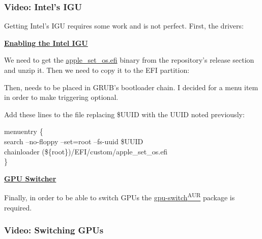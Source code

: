 \subsubsection{Video: Intel's IGU}

Getting Intel's IGU requires some work and is not perfect. First, the drivers:


\vspace*{1em}
\textbf{\textcolor{textgrey}{\uline{Enabling the Intel IGU}}}

We need to get the  \href{https://github.com/0xbb/apple\_set_os.efi}{apple\_set\_os.efi} binary from the repository's release section and unzip it. Then we need to copy it to the EFI partition:


Then,  needs to be placed in GRUB's bootloader chain. I decided for a menu item in order to make triggering  optional.

\begin{blocksection}
	Add these lines to the file replacing \textcolor{codekeyword1}{\$UUID} with the UUID noted previously:\vspace*{1em}
	\begin{codeblock}
		menuentry \{\\
			\tab search --no-floppy --set=root --fs-uuid \textcolor{codekeyword1}{\$UUID}\\
			\tab chainloader (\$\{root\})/EFI/custom/apple\_set\_os.efi\\
		\}
	\end{codeblock}
\end{blocksection}

\vspace*{1em}
\textbf{\textcolor{textgrey}{\uline{GPU Switcher}}}

Finally, in order to be able to switch GPUs the \href{https://github.com/0xbb/gpu-switch}{gpu-switch\textsuperscript{AUR}} package is required.



\subsubsection{Video: Switching GPUs}

